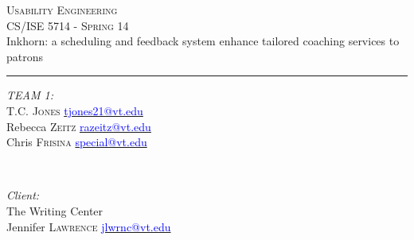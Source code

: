 \documentclass[12pt]{article} %
\newcommand{\HRule}{\rule{\linewidth}{0.5mm}} %
\begin{document}
\begin{titlepage}

  \center %

  \textsc{\LARGE Usability Engineering}\\[1.5mm] 
  \textsc{\Large CS/ISE 5714 - Spring 14}\\[1mm] 

  { \small Inkhorn: a scheduling and feedback system enhance tailored coaching services to patrons }\\
  \HRule
  \vspace{4mm}

  \begin{minipage}{0.4\textwidth}
  \begin{flushleft} \small
  \emph{TEAM 1:}\\
  T.C. \textsc{Jones} \href{mailto:tjones21@vt.edu}{\textcolor{blue}{tjones21@vt.edu}}\\
  Rebecca \textsc{Zeitz} \href{mailto:razeitz@vt.edu}{\textcolor{blue}{razeitz@vt.edu}}\\
  Chris \textsc{Frisina}  \href{mailto:special@vt.edu}{\textcolor{blue}{special@vt.edu}}\\
  \end{flushleft}
  \end{minipage}
  ~
  \begin{minipage}{0.4\textwidth}
  \begin{flushright} \small
  \emph{Client:} \\
  The Writing Center\\
  Jennifer \textsc{Lawrence}  \href{mailto:jlwrnc@vt.edu}{\textcolor{blue}{jlwrnc@vt.edu}}
  \end{flushright}
  \end{minipage}\\
  [5mm]
  
  \begingroup
  \def\addvspace#1{}
  \tableofcontents
  \endgroup
\end{titlepage}
\end{document}
